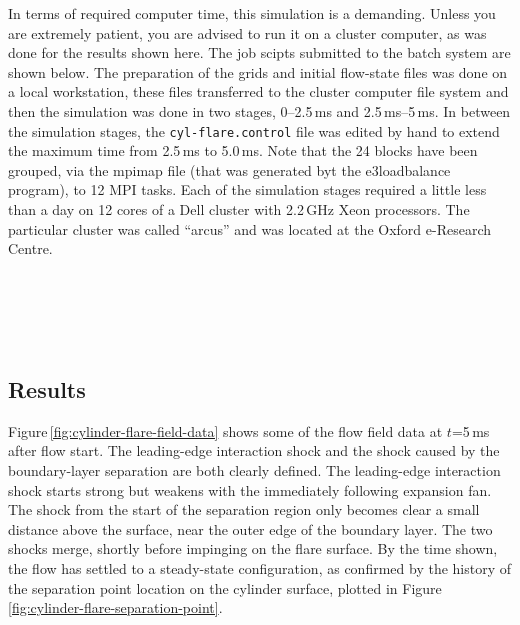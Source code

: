 \medskip
In terms of required computer time, this simulation is a demanding.
Unless you are extremely patient, you are advised to run it on a cluster computer,
as was done for the results shown here.
The job scipts submitted to the batch system are shown below.
The preparation of the grids and initial flow-state files was done on a local workstation, 
these files transferred to the cluster computer file system and 
then the simulation was done in two stages, 
0--2.5\,ms and 2.5\,ms--5\,ms.
In between the simulation stages, the \texttt{cyl-flare.control} file was edited by hand
to extend the maximum time from 2.5\,ms to 5.0\,ms.
Note that the 24 blocks have been grouped, via the mpimap file 
(that was generated byt the e3loadbalance program), to 12 MPI tasks.
Each of the simulation stages required a little less than a day on 12 cores of a Dell cluster 
with 2.2\,GHz Xeon processors.
The particular cluster was called ``arcus'' and was located at the Oxford e-Research Centre.

\noindent
\topbar
{}
\bottombar\\
\topbar
{}
\bottombar\\
\topbar

\bottombar\\

\subsection{Results}
%
Figure\,\ref{fig:cylinder-flare-field-data} shows some of the flow field data at $t$=5\,ms after flow start.
The leading-edge interaction shock and the shock caused by the boundary-layer separation
are both clearly defined.
The leading-edge interaction shock starts strong but weakens with the immediately following expansion fan.
The shock from the start of the separation region only becomes clear a small distance above the surface,
near the outer edge of the boundary layer.
The two shocks merge, shortly before impinging on the flare surface.
By the time shown, the flow has settled to a steady-state configuration,
as confirmed by the history of the separation point location on the cylinder surface,
plotted in Figure\,\ref{fig:cylinder-flare-separation-point}.

